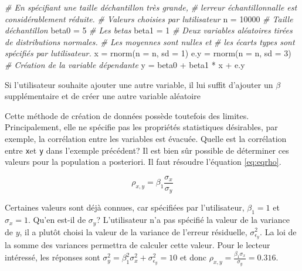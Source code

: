 \documentclass[
]{book}
\newenvironment{Shaded}{}{}
\newcommand{\AttributeTok}[1]{#1}
\newcommand{\CommentTok}[1]{\textit{#1}}
\newcommand{\DecValTok}[1]{#1}
\newcommand{\FunctionTok}[1]{#1}
\newcommand{\NormalTok}[1]{#1}
\newcommand{\OtherTok}[1]{#1}
\newcommand{\SpecialCharTok}[1]{#1}
\begin{document}
\begin{Shaded}
\begin{Highlighting}[]
\CommentTok{\# En spécifiant une taille d\textquotesingle{}échantillon très grande,}
\CommentTok{\# l\textquotesingle{}erreur échantillonnalle est considérablement réduite.}
\CommentTok{\# Valeurs choisies par l\textquotesingle{}utilisateur}
\NormalTok{n }\OtherTok{=} \DecValTok{10000} \CommentTok{\# Taille d\textquotesingle{}échantillon}
\NormalTok{beta0 }\OtherTok{=} \DecValTok{5} \CommentTok{\# Les betas}
\NormalTok{beta1 }\OtherTok{=} \DecValTok{1}
\CommentTok{\# Deux variables aléatoires tirées de distributions normales.}
\CommentTok{\# Les moyennes sont nulles et }
\CommentTok{\# les écarts types sont spécifiés par l\textquotesingle{}utilisateur.}
\NormalTok{x }\OtherTok{=} \FunctionTok{rnorm}\NormalTok{(}\AttributeTok{n =}\NormalTok{ n, }\AttributeTok{sd =} \DecValTok{1}\NormalTok{)}
\NormalTok{e.y }\OtherTok{=} \FunctionTok{rnorm}\NormalTok{(}\AttributeTok{n =}\NormalTok{ n, }\AttributeTok{sd =} \DecValTok{3}\NormalTok{)}
\CommentTok{\# Création de la variable dépendante}
\NormalTok{y }\OtherTok{=}\NormalTok{ beta0 }\SpecialCharTok{+}\NormalTok{ beta1 }\SpecialCharTok{*}\NormalTok{ x }\SpecialCharTok{+}\NormalTok{ e.y}
\end{Highlighting}
\end{Shaded}

Si l'utilisateur souhaite ajouter une autre variable, il lui suffit d'ajouter un \(\beta\) supplémentaire et de créer une autre variable aléatoire

Cette méthode de création de données possède toutefois des limites. Principalement, elle ne spécifie pas les propriétés statistiques désirables, par exemple, la corrélation entre les variables est évacuée. Quelle est la corrélation entre \texttt{x}et \texttt{y} dans l'exemple précédent? Il est bien sûr possible de déterminer ces valeurs pour la population a posteriori. Il faut résoudre l'équation \eqref{eq:eqrho}.

\begin{equation}
\rho_{x,y} = \beta_1 \frac{\sigma_x}{\sigma_y} 
\label{eq:eqrho}
\end{equation}

Certaines valeurs sont déjà connues, car spécifiées par l'utilisateur, \(\beta_1 = 1\) et \(\sigma_x = 1\). Qu'en est-il de \(\sigma_y\)? L'utilisateur n'a pas spécifié la valeur de la variance de \(y\), il a plutôt choisi la valeur de la variance de l'erreur résiduelle, \(\sigma^2_{\epsilon_y}\). La loi de la somme des variances permettra de calculer cette valeur. Pour le lecteur intéressé, les réponses sont \(\sigma^2_y = \beta_1^2\sigma^2_x+\sigma^2_{\epsilon_y} = 10\) et donc \(\rho_{x,y} = \frac{\beta_1 \sigma_x}{\sigma_y} = 0.316\).
\end{document}
